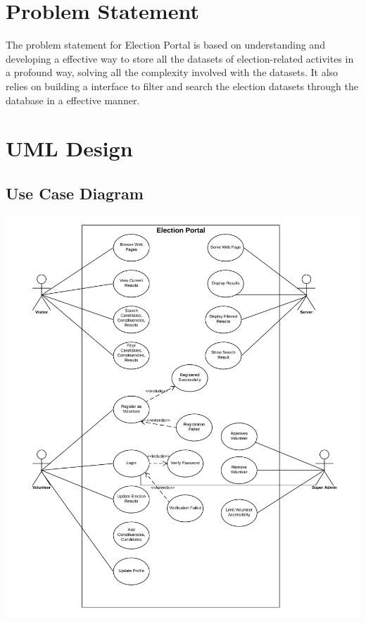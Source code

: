 \documentclass[12pt]{article}
\begin{document}
\section{Problem Statement}
The problem statement for Election Portal is based on understanding and developing a effective way to store all the datasets of election-related activites in a profound way, solving all the complexity involved with the datasets. It also relies on building a interface to filter and search the election datasets through the database in a effective manner.
\newpage


\section{UML Design}
\subsection{Use Case Diagram}
\includegraphics[scale=0.6]{election_portal_use_case_diagram.png}\\
\end{document}
